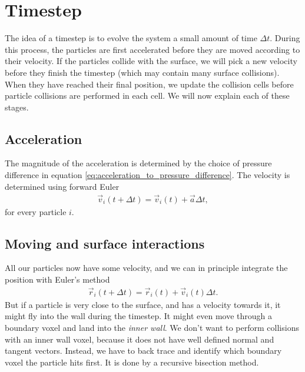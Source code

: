 \section{Timestep}
\label{sec:dsmc_implementation_timestep}
The idea of a timestep is to evolve the system a small amount of time $\Delta t$. During this process, the particles are first accelerated before they are moved according to their velocity. If the particles collide with the surface, we will pick a new velocity before they finish the timestep (which may contain many surface collisions). When they have reached their final position, we update the collision cells before particle collisions are performed in each cell. We will now explain each of these stages.
\subsection{Acceleration}
The magnitude of the acceleration is determined by the choice of pressure difference in equation \eqref{eq:acceleration_to_pressure_difference}. The velocity is determined using forward Euler
\begin{align}
	\vec v_i(t + \Delta t) = \vec v_i(t) + \vec a\Delta t,
\end{align}
for every particle $i$. 
\subsection{Moving and surface interactions}
All our particles now have some velocity, and we can in principle integrate the position with Euler's method
\begin{align}
	\vec r_i(t + \Delta t) = \vec r_i(t) + \vec v_i(t)\Delta t.
\end{align}
But if a particle is very close to the surface, and has a velocity towards it, it might fly into the wall during the timestep. It might even move through a boundary voxel and land into the \textit{inner wall}. We don't want to perform collisions with an inner wall voxel, because it does not have well defined normal and tangent vectors. Instead, we have to back trace and identify which boundary voxel the particle hits first. It is done by a recursive bisection method.

